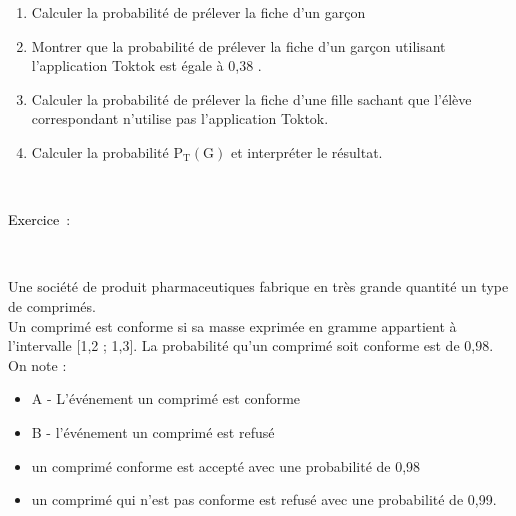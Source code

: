 \documentclass[11pt,a4paper]{article}
\newcounter{numexos}%
\newcommand{\exercice}[1]{%
\addtocounter{numexos}{1}%
\textcolor{black}{\normalsize Exercice\,\thenumexos\,}\,#1%
}
\newcommand{\bex}[2]
{\begin{bclogo}[couleur = white,logo= , barre=none,  arrondi = 0.1]
{~\exercice:~~{#1}}
~~
{#2}
~~
\end{bclogo}}
\begin{document}
\begin{enumerate}
    \item Calculer la probabilité de prélever la fiche d'un garçon

    \vspace{3mm}
    \dotfill 

    \item Montrer que la probabilité de prélever la fiche d'un garçon utilisant l'application Toktok est égale à 0,38 . 

    \vspace{3mm}
    \dotfill
    
    \item Calculer la probabilité de prélever la fiche d'une fille sachant que l'élève correspondant n'utilise pas l'application Toktok. 

    
    \vspace{3mm}
    \dotfill

    \item Calculer la probabilité $\mathrm{P_T(G)}$ et interpréter le résultat. 

   
    \vspace{3mm}
    \dotfill 

    
\end{enumerate}

\newpage

\bex{}{
Une société de produit pharmaceutiques fabrique en très grande quantité un type de comprimés. \\
Un comprimé est conforme si sa masse exprimée en gramme appartient à l'intervalle [1,2 ; 1,3]. La probabilité qu'un comprimé soit conforme est de 0,98. \\
On note :\\[-8mm]
\begin{itemize}
    \item A - L'événement un comprimé est conforme 
    \item B - l'événement un comprimé est refusé
    \item un comprimé conforme est accepté avec une probabilité de 0,98
    \item un comprimé qui n'est pas conforme est refusé avec une probabilité de 0,99.
\end{itemize}

}
\end{document}
